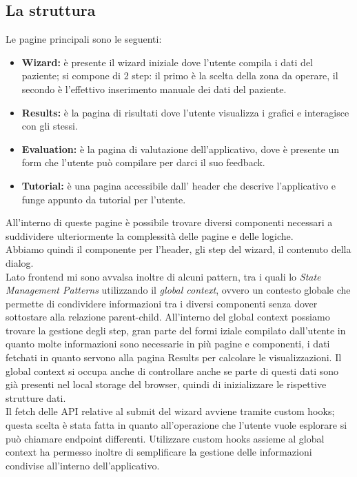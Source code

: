 \subsection{La struttura}
Le pagine principali sono le seguenti:\\ 
\begin{itemize}
    \item \textbf{Wizard:} è presente il wizard iniziale dove l'utente compila i dati del paziente; si compone di 2 step:  il primo è la scelta della zona da operare, il secondo è l'effettivo inserimento manuale dei dati del paziente.
    \item \textbf{Results:} è la pagina di risultati dove l'utente visualizza i grafici e interagisce con gli stessi.
    \item \textbf{Evaluation:} è la pagina di valutazione dell'applicativo, dove è presente un form che l'utente può compilare per darci il suo feedback. 
    \item \textbf{Tutorial:} è una pagina accessibile dall' header che descrive l'applicativo e funge appunto da tutorial per l'utente. 
\end{itemize}
All'interno di queste pagine è possibile trovare diversi componenti necessari a suddividere ulteriormente la complessità delle pagine e delle logiche.\\ 
Abbiamo quindi il componente per l'header, gli step del wizard, il contenuto della dialog.\\

Lato frontend mi sono avvalsa inoltre di alcuni pattern, tra i quali lo \textit{State Management Patterns} utilizzando il \textit{global context}, ovvero un contesto globale che permette di condividere informazioni tra i diversi componenti senza dover sottostare alla relazione parent-child. All'interno del global context possiamo trovare la gestione degli step, gran parte del formi iziale compilato dall'utente in quanto molte informazioni sono necessarie in più pagine e componenti, i dati fetchati in quanto servono alla pagina Results per calcolare le visualizzazioni. Il global context si occupa anche di controllare anche se parte di questi dati sono già presenti nel local storage del browser, quindi di inizializzare le rispettive strutture dati.\\

Il fetch delle API relative al submit del wizard avviene tramite custom hooks; questa scelta è stata fatta in quanto all'operazione che l'utente vuole esplorare si può chiamare endpoint differenti. Utilizzare custom hooks assieme al global context ha permesso inoltre di semplificare la gestione delle informazioni condivise all'interno dell'applicativo.\\


